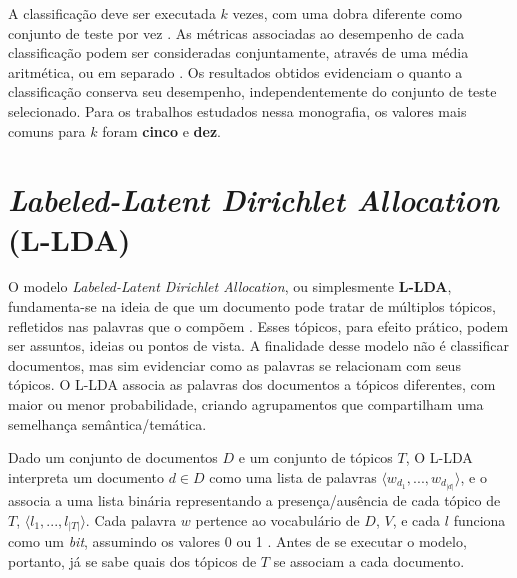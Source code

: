 A classificação deve ser executada \ensuremath{k} vezes, com uma dobra diferente como conjunto de teste por vez \cite{ron-kohavi}. As métricas associadas ao desempenho de cada classificação podem ser consideradas conjuntamente, através de uma média aritmética, ou em separado \cite{payam-leitang}. Os resultados obtidos evidenciam o quanto a classificação conserva seu desempenho, independentemente do conjunto de teste selecionado. Para os trabalhos estudados nessa monografia, os valores mais comuns para \ensuremath{k} foram \textbf{cinco} e \textbf{dez}. 



\section{\emph{Labeled-Latent Dirichlet Allocation} (L-LDA)}
\label{subsection:LDA}


O modelo \emph{Labeled-Latent Dirichlet Allocation}, ou simplesmente \textbf{L-LDA}, fundamenta-se na ideia de que um documento pode tratar de múltiplos tópicos, refletidos nas palavras que o compõem \cite{pnas}. Esses tópicos, para efeito prático, podem ser assuntos, ideias ou pontos de vista. A finalidade desse modelo não é classificar documentos, mas sim evidenciar como as palavras se relacionam com seus tópicos. O L-LDA associa as palavras dos documentos a tópicos diferentes, com maior ou menor probabilidade, criando agrupamentos que compartilham uma semelhança semântica/temática. 

Dado um conjunto de documentos \ensuremath{D} e um conjunto de tópicos \ensuremath{T}, O L-LDA interpreta um documento \ensuremath{d \in D} como uma lista de palavras \ensuremath{\langle w_{d_1}, ..., w_{d_{|d|}} \rangle}, e o associa a uma lista binária representando a presença/ausência de cada tópico de \ensuremath{T}, \ensuremath{\langle l_1, ..., l_{|T|} \rangle}. Cada palavra \ensuremath{w} pertence ao vocabulário de \ensuremath{D}, \ensuremath{V}, e cada \ensuremath{l} funciona como um \emph{bit}, assumindo os valores 0 ou 1 \cite{llda}. Antes de se executar o modelo, portanto, já se sabe quais dos tópicos de \ensuremath{T} se associam a cada documento. 

